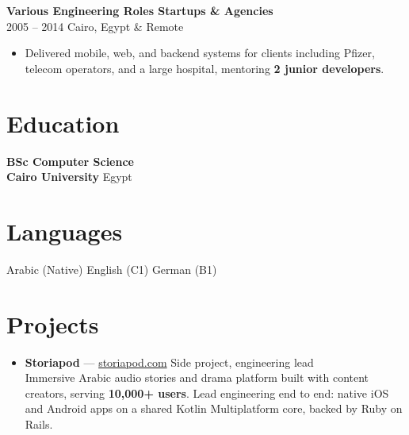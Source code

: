 \documentclass[10pt,a4paper]{article}
\newcommand{\expitem}[4]{%
  \vspace{2pt}%
  {\normalsize\bfseries\color{darktext}#1 \textbullet{} \color{accent}#2}\\[1pt]%
  {\small\color{muted}#3 \textbullet{} #4}%
  \par\vspace{3pt}%
}
\newenvironment{plainlist}{%
  \begin{itemize}[leftmargin=0pt, label={}, topsep=2pt, itemsep=2pt]
}{\end{itemize}}
\begin{document}
\expitem{Various Engineering Roles}{Startups \& Agencies}{2005 -- 2014}{Cairo, Egypt \& Remote}
\begin{itemize}
  \item Delivered mobile, web, and backend systems for clients including Pfizer, telecom operators, and a large hospital, mentoring \textbf{2 junior developers}.
\end{itemize}

\section{Education}
{\normalsize\bfseries\color{darktext} BSc Computer Science}\\[2pt]
{\small\bfseries\color{accent} Cairo University} {\small\color{muted}\textbullet{} Egypt}

\section{Languages}
{\small\color{bodytext} Arabic (Native) \textbullet{} English (C1) \textbullet{} German (B1)}

\section{Projects}
\begin{plainlist}
  \item {\small \textbf{Storiapod} --- \href{https://storiapod.com}{storiapod.com} \textbullet{} Side project, engineering lead\\[1pt]
  {\color{bodytext}Immersive Arabic audio stories and drama platform built with content creators, serving \textbf{10,000+ users}. Lead engineering end to end: native iOS and Android apps on a shared Kotlin Multiplatform core, backed by Ruby on Rails.}}
\end{plainlist}
\end{document}
